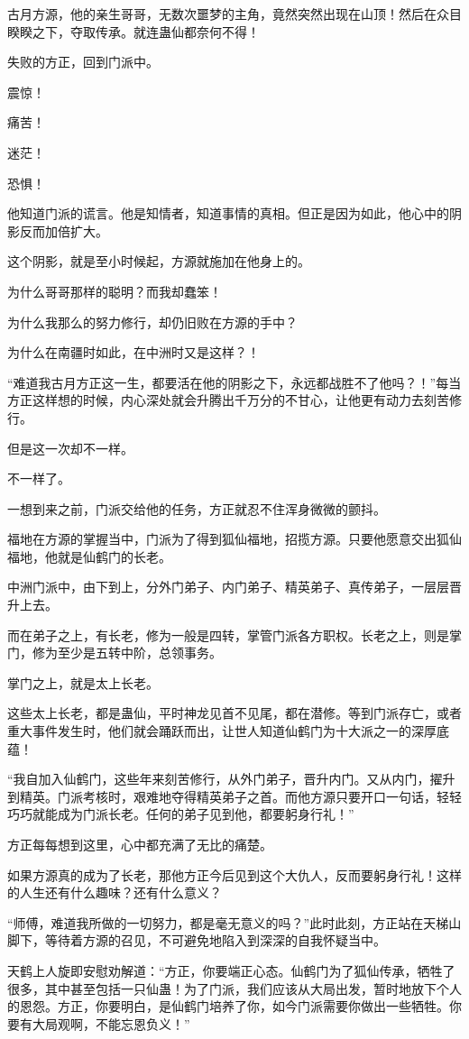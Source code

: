 \begin{this_body}
古月方源，他的亲生哥哥，无数次噩梦的主角，竟然突然出现在山顶！然后在众目睽睽之下，夺取传承。就连蛊仙都奈何不得！

失败的方正，回到门派中。

震惊！

痛苦！

迷茫！

恐惧！

他知道门派的谎言。他是知情者，知道事情的真相。但正是因为如此，他心中的阴影反而加倍扩大。

这个阴影，就是至小时候起，方源就施加在他身上的。

为什么哥哥那样的聪明？而我却蠢笨！

为什么我那么的努力修行，却仍旧败在方源的手中？

为什么在南疆时如此，在中洲时又是这样？！

“难道我古月方正这一生，都要活在他的阴影之下，永远都战胜不了他吗？！”每当方正这样想的时候，内心深处就会升腾出千万分的不甘心，让他更有动力去刻苦修行。

但是这一次却不一样。

不一样了。

一想到来之前，门派交给他的任务，方正就忍不住浑身微微的颤抖。

福地在方源的掌握当中，门派为了得到狐仙福地，招揽方源。只要他愿意交出狐仙福地，他就是仙鹤门的长老。

中洲门派中，由下到上，分外门弟子、内门弟子、精英弟子、真传弟子，一层层晋升上去。

而在弟子之上，有长老，修为一般是四转，掌管门派各方职权。长老之上，则是掌门，修为至少是五转中阶，总领事务。

掌门之上，就是太上长老。

这些太上长老，都是蛊仙，平时神龙见首不见尾，都在潜修。等到门派存亡，或者重大事件发生时，他们就会踊跃而出，让世人知道仙鹤门为十大派之一的深厚底蕴！

“我自加入仙鹤门，这些年来刻苦修行，从外门弟子，晋升内门。又从内门，擢升到精英。门派考核时，艰难地夺得精英弟子之首。而他方源只要开口一句话，轻轻巧巧就能成为门派长老。任何的弟子见到他，都要躬身行礼！”

方正每每想到这里，心中都充满了无比的痛楚。

如果方源真的成为了长老，那他方正今后见到这个大仇人，反而要躬身行礼！这样的人生还有什么趣味？还有什么意义？

“师傅，难道我所做的一切努力，都是毫无意义的吗？”此时此刻，方正站在天梯山脚下，等待着方源的召见，不可避免地陷入到深深的自我怀疑当中。

天鹤上人旋即安慰劝解道：“方正，你要端正心态。仙鹤门为了狐仙传承，牺牲了很多，其中甚至包括一只仙蛊！为了门派，我们应该从大局出发，暂时地放下个人的恩怨。方正，你要明白，是仙鹤门培养了你，如今门派需要你做出一些牺牲。你要有大局观啊，不能忘恩负义！”


\end{this_body}
